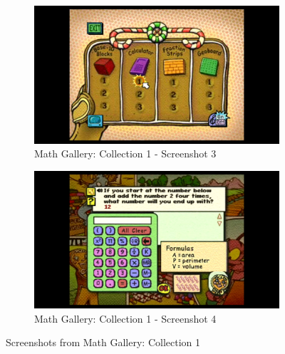 \begin{figure}[H]
    \begin{subfigure}{0.45\textwidth}
        \centering
        \includegraphics[width=\linewidth]{Games/MathGalleryCollection/Images/MathGalleryCollection1Image3.png}
        \caption{Math Gallery: Collection 1 - Screenshot 3}
    \end{subfigure}
    \begin{subfigure}{0.45\textwidth}
        \centering
        \includegraphics[width=\linewidth]{Games/MathGalleryCollection/Images/MathGalleryCollection1Image4.png}
        \caption{Math Gallery: Collection 1 - Screenshot 4}
    \end{subfigure}
    \caption{Screenshots from Math Gallery: Collection 1}
\end{figure}